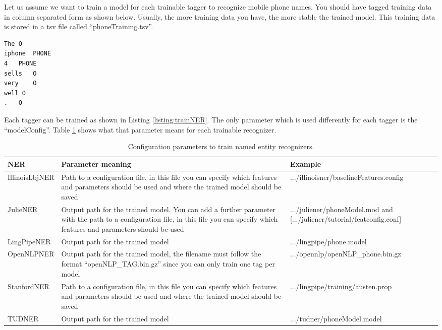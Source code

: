 Let us assume we want to train a model for each trainable tagger to recognize mobile phone names. You should have tagged training data in column separated form as shown below. Usually, the more training data you have, the more stable the trained model. This training data is stored in a tsv file called ``phoneTraining.tsv''.

\begin{verbatim}
The	O
iphone	PHONE
4	PHONE
sells	O
very	O
well O
.	O
\end{verbatim}

Each tagger can be trained as shown in Listing \ref{listing:trainNER}. The only parameter which is used differently for each tagger is the ``modelConfig''. Table \ref{tab:nerConfig} shows what that parameter means for each trainable recognizer.

\begin{table}[ht]
\centering
\begin{tabularx}{\linewidth}{|l|X|X|}
\hline
NER		& Parameter meaning & Example \\
\hline
IllinoisLbjNER	& Path to a configuration file, in this file you can specify which features and parameters should be used and where the trained model should be saved &	.../illinoisner/baselineFeatures.config \\
\hline
JulieNER	& Output path for the trained model. You can add a further parameter with the path to a configuration file, in this file you can specify which features and parameters should be used &	.../juliener/phoneModel.mod and [.../juliener/tutorial/featconfig.conf] \\
\hline
LingPipeNER	& Output path for the trained model &	.../lingpipe/phone.model \\
\hline
OpenNLPNER	& Output path for the trained model, the filename must follow the format ``openNLP\_TAG.bin.gz'' since you can only train one tag per model &	.../opennlp/openNLP\_phone.bin.gz \\
\hline
StanfordNER	& Path to a configuration file, in this file you can specify which features and parameters should be used and where the trained model should be saved &	.../lingpipe/training/austen.prop \\
\hline
TUDNER	& Output path for the trained model &	.../tudner/phoneModel.model \\
\hline
\end{tabularx} 
\caption{Configuration parameters to train named entity recognizers.}
\label{tab:nerConfig}
\end{table}


